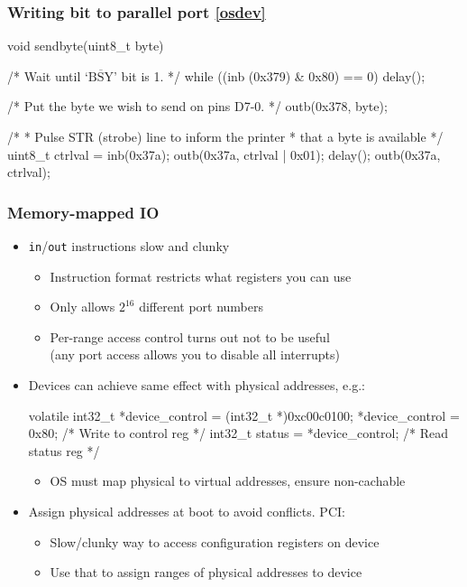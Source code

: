 \documentclass[11pt,aspectratio=169]{beamer}
\begin{document}
\begin{frame}[fragile]
\frametitle{Writing bit to parallel port
\href{http://wiki.osdev.org/Parallel_port}{[osdev]}}
\begin{ccode}
   void
   sendbyte(uint8_t byte)
   {
     /* Wait until `\color{comment}$\overline{\mbox{BSY}}$' bit is 1. */
     while ((inb (0x379) & 0x80) == 0)
       delay();

     /* Put the byte we wish to send on pins D7-0. */
     outb(0x378, byte);

     /*
      * Pulse STR (strobe) line to inform the printer
      * that a byte is available
      */
     uint8_t ctrlval = inb(0x37a);
     outb(0x37a, ctrlval | 0x01);
     delay();
     outb(0x37a, ctrlval);
   }  
\end{ccode}
\end{frame}

\begin{frame}[fragile]
\frametitle{Memory-mapped IO}
\begin{itemize}
  \item \texttt{in}/\texttt{out} instructions slow and clunky
  \begin{itemize}
    \item Instruction format restricts what registers you can use
    \item Only allows $2^{16}$ different port numbers
    \item Per-range access control turns out not to be useful \\
      (any port access allows you to disable all interrupts)
  \end{itemize}
  \item Devices can achieve same effect with physical addresses, e.g.:
\begin{ccode}
    volatile int32_t *device_control = (int32_t *)0xc00c0100;
    *device_control = 0x80; /* Write to control reg */
    int32_t status = *device_control; /* Read status reg */
\end{ccode}
  \begin{itemize}
    \item OS must map physical to virtual addresses, ensure
      non-cachable
  \end{itemize}
  \item Assign physical addresses at boot to avoid conflicts.  PCI:
  \begin{itemize}
    \item Slow/clunky way to access configuration registers on device
    \item Use that to assign ranges of physical addresses to device
  \end{itemize}
\end{itemize}
\end{frame}
\end{document}
